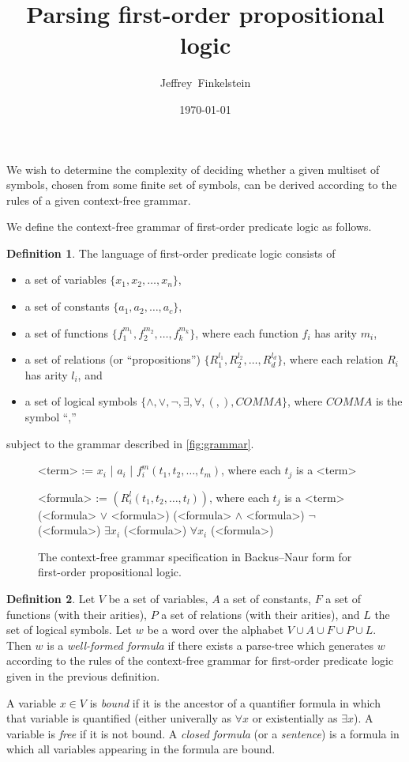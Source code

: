 \documentclass[draft]{article}
\author{Jeffrey~Finkelstein}
\title{Parsing first-order propositional logic}
\date{\today}
\theoremstyle{definition}
\newtheorem{definition}{Definition}
\begin{document}
\maketitle

We wish to determine the complexity of deciding whether a given multiset of symbols, chosen from some finite set of symbols, can be derived according to the rules of a given context-free grammar.

We define the context-free grammar of first-order predicate logic as follows.
\begin{definition}
  The language of first-order predicate logic consists of
  \begin{itemize}
  \item a set of variables $\{x_1, x_2, \ldots, x_n\}$,
  \item a set of constants $\{a_1, a_2, \ldots, a_c\}$,
  \item a set of functions $\{f^{m_1}_1, f^{m_2}_2, \ldots, f^{m_k}_k\}$, where each function $f_i$ has arity $m_i$,
  \item a set of relations (or ``propositions'') $\{R^{l_1}_1, R^{l_2}_2, \ldots, R^{l_d}_d\}$, where each relation $R_i$ has arity $l_i$, and
  \item a set of logical symbols $\{\land, \lor, \lnot, \exists, \forall, (, ), COMMA \}$, where $COMMA$ is the symbol ``,''
  \end{itemize}
  subject to the grammar described in \autoref{fig:grammar}.
  \begin{figure}
    \caption{\label{fig:grammar}The context-free grammar specification in Backus--Naur form for first-order propositional logic.}
  \begin{grammar}
    <term> := $x_i$ | $a_i$ | $f^m_i(t_1, t_2, \ldots, t_m)$, where each $t_j$ is a <term>

    <formula> := $(R^l_i(t_1, t_2, \ldots, t_l))$, where each $t_j$ is a <term>
    \alt (<formula> $\lor$ <formula>)
    \alt (<formula> $\land$ <formula>)
    \alt $\lnot$ (<formula>)
    \alt $\exists x_i$ (<formula>)
    \alt $\forall x_i$ (<formula>)
  \end{grammar}
  \end{figure}
\end{definition}
\begin{definition}
  Let $V$ be a set of variables, $A$ a set of constants, $F$ a set of functions (with their arities), $P$ a set of relations (with their arities), and $L$ the set of logical symbols.
  Let $w$ be a word over the alphabet $V\cup A\cup F\cup P\cup L$.
  Then $w$ is a \emph{well-formed formula} if there exists a parse-tree which generates $w$ according to the rules of the context-free grammar for first-order predicate logic given in the previous definition.

  A variable $x\in V$ is \emph{bound} if it is the ancestor of a quantifier formula in which that variable is quantified (either univerally as $\forall x$ or existentially as $\exists x$).
  A variable is \emph{free} if it is not bound.
  A \emph{closed formula} (or a \emph{sentence}) is a formula in which all variables appearing in the formula are bound.
\end{definition}
\end{document}
